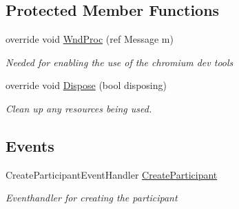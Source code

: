 \subsection*{Protected Member Functions}
\begin{DoxyCompactItemize}
\item 
override void \hyperlink{class_web_analyzer_1_1_u_i_1_1_edit_participant_form_acc5ebe40ecb86fb98dd6e3c26374d83b}{Wnd\+Proc} (ref Message m)
\begin{DoxyCompactList}\small\item\em Needed for enabling the use of the chromium dev tools \end{DoxyCompactList}\item 
override void \hyperlink{class_web_analyzer_1_1_u_i_1_1_edit_participant_form_ab179f939e7a27ea90bddfc33a67335f8}{Dispose} (bool disposing)
\begin{DoxyCompactList}\small\item\em Clean up any resources being used. \end{DoxyCompactList}\end{DoxyCompactItemize}
\subsection*{Events}
\begin{DoxyCompactItemize}
\item 
Create\+Participant\+Event\+Handler \hyperlink{class_web_analyzer_1_1_u_i_1_1_edit_participant_form_a3c5b726a8fd6993ccc519319a6850ce3}{Create\+Participant}
\begin{DoxyCompactList}\small\item\em Eventhandler for creating the participant \end{DoxyCompactList}\end{DoxyCompactItemize}
